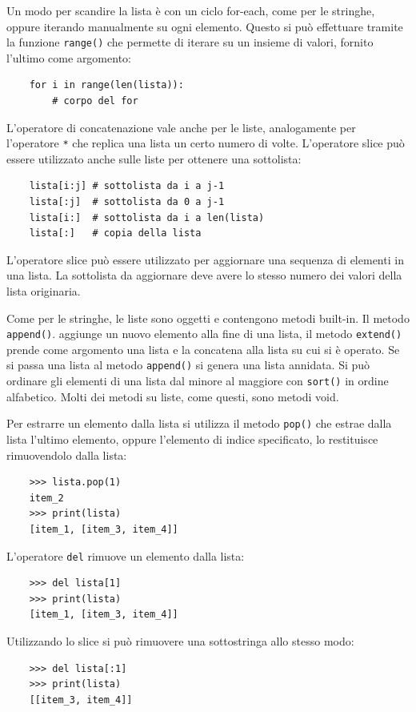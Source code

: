 \documentclass{article}
\numberwithin{equation}{subsection}
\begin{document}
Un modo per scandire la lista è con un ciclo for-each, come per le stringhe, oppure iterando manualmente su ogni elemento. Questo si può effettuare tramite 
la funzione \verb|range()| che permette di iterare su un insieme di valori, fornito l'ultimo come argomento:
\begin{verbatim}
    for i in range(len(lista)):
        # corpo del for
\end{verbatim}

L'operatore di concatenazione vale anche per le liste, analogamente per l'operatore \verb|*| che replica una lista un certo numero di volte. 
L'operatore slice può essere utilizzato anche sulle liste per ottenere una sottolista:
\begin{verbatim}
    lista[i:j] # sottolista da i a j-1
    lista[:j]  # sottolista da 0 a j-1
    lista[i:]  # sottolista da i a len(lista)
    lista[:]   # copia della lista
\end{verbatim}
L'operatore slice può essere utilizzato per aggiornare una sequenza di elementi in una lista. La sottolista da aggiornare deve avere lo stesso numero dei valori della 
lista originaria. 

Come per le stringhe, le liste sono oggetti e contengono metodi built-in. 
Il metodo \verb|append()|. aggiunge un nuovo elemento alla fine di una lista, il metodo \verb|extend()| prende come argomento una lista e la concatena alla lista su cui 
si è operato. Se si passa una lista al metodo \verb|append()| si genera una lista annidata. 
Si può ordinare gli elementi di una lista dal minore al maggiore con \verb|sort()| in ordine alfabetico. Molti dei metodi su liste, come questi, sono metodi void. 

Per estrarre un elemento dalla lista si utilizza il metodo \verb|pop()| che estrae dalla lista l'ultimo elemento, oppure l'elemento di indice specificato, 
lo restituisce rimuovendolo dalla lista:
\begin{verbatim}
    >>> lista.pop(1)
    item_2
    >>> print(lista)
    [item_1, [item_3, item_4]]
\end{verbatim}
L'operatore \verb|del| rimuove un elemento dalla lista:
\begin{verbatim}
    >>> del lista[1]
    >>> print(lista)
    [item_1, [item_3, item_4]]
\end{verbatim}
Utilizzando lo slice si può rimuovere una sottostringa allo stesso modo:
\begin{verbatim}
    >>> del lista[:1]
    >>> print(lista)
    [[item_3, item_4]]
\end{verbatim}
\end{document}
